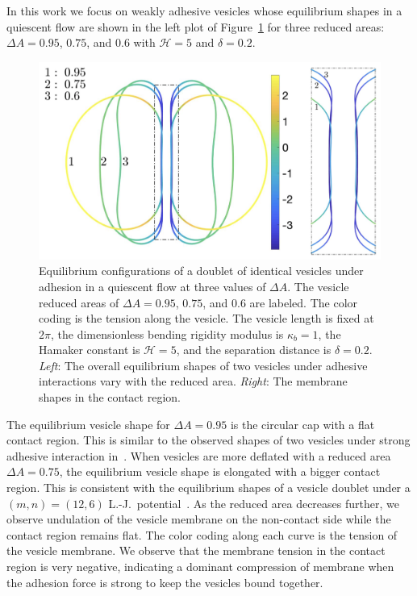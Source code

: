 \documentclass[prf,superscriptaddress,showpacs]{revtex4-1}
\begin{document}
In this work we focus on weakly adhesive vesicles whose equilibrium
shapes in a quiescent flow are shown in the left plot of
Figure~\ref{fig:Dec18_vesicle_shape} for three reduced areas: $\Delta
A=0.95$, $0.75$, and $0.6$ with $\mathcal{H}=5$ and $\delta = 0.2$. 
\begin{figure}
   \includegraphics[keepaspectratio=true,scale=0.5]{figs/Dec18_vesicle_shape_vs_rA_composite.png}
  \caption{\label{fig:Dec18_vesicle_shape} Equilibrium configurations
  of a doublet of identical vesicles under adhesion in a quiescent flow at three values of $\Delta A$.
  The vesicle reduced areas of $\Delta A=0.95$, $0.75$, and $0.6$ are
  labeled.  The color coding is the tension along the vesicle.  The
  vesicle length is fixed at $2\pi$, the dimensionless bending rigidity
  modulus is $\kappa_b=1$, the Hamaker constant is $\mathcal{H}=5$, and
  the separation distance is $\delta=0.2$.  {\em Left}: The overall
  equilibrium shapes of two vesicles under adhesive interactions vary
  with the reduced area.  {\em Right}: The membrane shapes in the
  contact region.} 
\end{figure}
The equilibrium vesicle shape for $\Delta A=0.95$ is the circular cap
with a flat contact region.  This is similar to the observed shapes of
two vesicles under strong adhesive interaction
in~\cite{RamachandranAndersonLealIsraelachvili2010_Langmuir}.  When
vesicles are more deflated with a reduced area $\Delta A = 0.75$, the
equilibrium vesicle shape is elongated with a bigger contact region.
This is consistent with the equilibrium shapes of a vesicle doublet
under a $(m,n) = (12,6)$
L.-J.~potential~\cite{FlormannAouane2017_SciReports}.  As the reduced
area decreases further, we observe undulation of the vesicle membrane on
the non-contact side while the contact region remains flat.  The color
coding along each curve is the tension of the vesicle membrane.  We
observe that the membrane tension in the contact region is very
negative, indicating a dominant compression of membrane when the
adhesion force is strong to keep the vesicles bound together.
\end{document}
